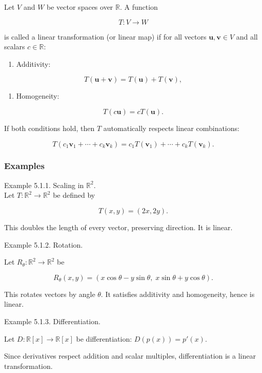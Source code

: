 \documentclass[
  12pt,
  a4paper,
]{article}
\begin{document}
Let \(V\) and \(W\) be vector spaces over \(\mathbb{R}\). A function

\[T : V \to W\]

is called a linear transformation (or linear map) if for all vectors
\(\mathbf{u}, \mathbf{v} \in V\) and all\\
scalars \(c \in \mathbb{R}\):

\begin{enumerate}
\def\labelenumi{\arabic{enumi}.}
\item
  Additivity:
\end{enumerate}

\[T(\mathbf{u} + \mathbf{v}) = T(\mathbf{u}) + T(\mathbf{v}),\]

\begin{enumerate}
\def\labelenumi{\arabic{enumi}.}
\item
  Homogeneity:
\end{enumerate}

\[T(c\mathbf{u}) = cT(\mathbf{u}).\]

If both conditions hold, then \(T\) automatically respects linear
combinations:

\[T(c_1\mathbf{v}_1 + \cdots + c_k\mathbf{v}_k) = c_1 T(\mathbf{v}_1) + \cdots + c_k T(\mathbf{v}_k).\]

\subsubsection{Examples}\label{examples-4}

Example 5.1.1. Scaling in \(\mathbb{R}^2\).\\
Let \(T:\mathbb{R}^2 \to \mathbb{R}^2\) be defined by

\[T(x,y) = (2x, 2y).\]

This doubles the length of every vector, preserving direction. It is
linear.

Example 5.1.2. Rotation.

Let \(R_\theta: \mathbb{R}^2 \to \mathbb{R}^2\) be

\[R_\theta(x,y) = (x\cos\theta - y\sin\theta, \; x\sin\theta + y\cos\theta).\]

This rotates vectors by angle \(\theta\). It satisfies additivity and
homogeneity, hence is linear.

Example 5.1.3. Differentiation.

Let \(D: \mathbb{R}[x] \to \mathbb{R}[x]\) be differentiation:
\(D(p(x)) = p'(x)\).

Since derivatives respect addition and scalar multiples, differentiation
is a linear transformation.
\end{document}
